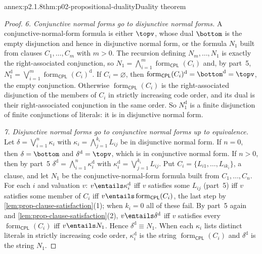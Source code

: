 \begin{annexitem}{annex:p2.1.8}{thm:p02-propositional-duality}{Duality theorem}
\begin{proof}
\emph{6. Conjunctive normal forms go to disjunctive normal forms.}  A
conjunctive-normal-form formula is either \(\topv\), whose dual \(\bottom\) is
the empty disjunction and hence in disjunctive normal form, or the formula
\(N_1\) built from clauses \(C_1,\ldots,C_m\) with \(m>0\).  The recursion
defining \(N_m,\ldots,N_1\) is exactly the right-associated conjunction, so
\(N_1=\bigwedge_{i=1}^m\operatorname{form}_{\mathsf{CPL}}(C_i)\) and, by
part~5,
\(N_1^{\mathrm d}=\bigvee_{i=1}^m\operatorname{form}_{\mathsf{CPL}}(C_i)^{\mathrm d}\).
If \(C_i=\varnothing\), then
\(\operatorname{form}_{\mathsf{CPL}}(C_i)^{\mathrm d}=\bottom^{\mathrm d}=\topv\),
the empty conjunction.  Otherwise
\(\operatorname{form}_{\mathsf{CPL}}(C_i)\) is the right-associated
disjunction of the members of \(C_i\) in strictly increasing code order, and
its dual is their right-associated conjunction in the same order.  So
\(N_1^{\mathrm d}\) is a finite disjunction of finite conjunctions of literals:
it is in disjunctive normal form.

\emph{7. Disjunctive normal forms go to conjunctive normal forms up to
equivalence.}  Let \(\delta=\bigvee_{i=1}^n\kappa_i\) with
\(\kappa_i=\bigwedge_{j=1}^{k_i}L_{ij}\) be in disjunctive normal form.  If
\(n=0\), then \(\delta=\bottom\) and \(\delta^{\mathrm d}=\topv\), which is in
conjunctive normal form.  If \(n>0\), then by part~5
\(\delta^{\mathrm d}=\bigwedge_{i=1}^n\kappa_i^{\mathrm d}\) with
\(\kappa_i^{\mathrm d}=\bigvee_{j=1}^{k_i}L_{ij}\).  Put
\(C_i=\{L_{i1},\ldots,L_{ik_i}\}\), a clause, and let \(N_1\) be the
conjunctive-normal-form formula built from \(C_1,\ldots,C_n\).  For each \(i\)
and valuation \(v\): \(v\entails\kappa_i^{\mathrm d}\) iff \(v\) satisfies some
\(L_{ij}\) (part~5) iff \(v\) satisfies some member of \(C_i\) iff
\(v\entails\operatorname{form}_{\mathsf{CPL}}(C_i)\), the last step by
\cref{lem:prop-clause-satisfaction}(1); when \(k_i=0\) all of these fail.  By
part~5 again and \cref{lem:prop-clause-satisfaction}(2),
\(v\entails\delta^{\mathrm d}\) iff \(v\) satisfies every
\(\operatorname{form}_{\mathsf{CPL}}(C_i)\) iff \(v\entails N_1\).  Hence
\(\delta^{\mathrm d}\equiv N_1\).  When each \(\kappa_i\) lists distinct
literals in strictly increasing code order, \(\kappa_i^{\mathrm d}\) is the
string \(\operatorname{form}_{\mathsf{CPL}}(C_i)\) and \(\delta^{\mathrm d}\)
is the string \(N_1\).


\end{proof}
\end{annexitem}
